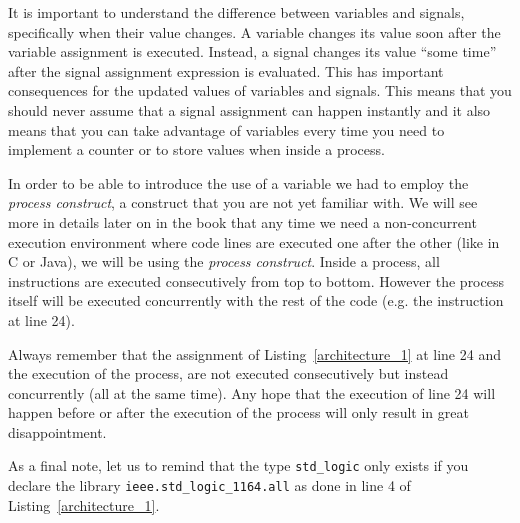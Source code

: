 It is important to understand the difference between variables and signals, specifically when their value changes. A variable changes its value soon after the variable assignment is executed. Instead, a signal changes its value ``some time'' after the signal assignment expression is evaluated. This has important consequences for the updated values of variables and signals. This means that you should never assume that a signal assignment can happen instantly and it also means that you can take advantage of variables every time you need to implement a counter or to store values when inside a process.

In order to be able to introduce the use of a variable we had to employ the \textit{process construct}, a construct that you are not yet familiar with. We will see more in details later on in the book that any time we need a non-concurrent execution environment where code lines are executed one after the other (like in C or Java), we will be using the \textit{process construct}. Inside a process, all instructions are executed consecutively from top to bottom. However the process itself will be executed concurrently with the rest of the code (e.g. the instruction at line 24).

Always remember that the assignment of Listing~\ref{architecture_1} at line 24 and the execution of the process, are not executed consecutively but instead concurrently (all at the same time). Any hope that the execution of line 24 will happen before or after the execution of the process will only result in great disappointment.

As a final note, let us to remind that the type \texttt{std\_logic} only exists if you declare the library \texttt{ieee.std\_logic\_1164.all} as done in line 4 of Listing~\ref{architecture_1}.

